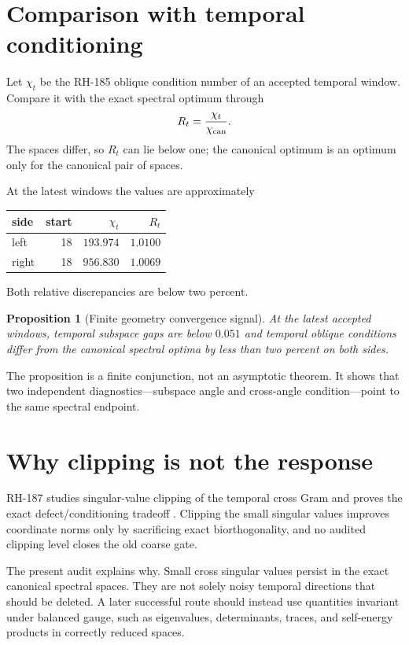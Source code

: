 \documentclass[12pt]{article}
\newtheorem{proposition}{Proposition}[section]
\theoremstyle{remark}
\begin{document}
\section{Comparison with temporal conditioning}

Let $\chi_t$ be the RH-185 oblique condition number of an accepted temporal
window.  Compare it with the exact spectral optimum through
\begin{equation}\label{eq:ratio}
 R_t=\frac{\chi_t}{\chi_{\rm can}}.
\end{equation}
The spaces differ, so $R_t$ can lie below one; the canonical optimum is an
optimum only for the canonical pair of spaces.

At the latest windows the values are approximately
\begin{center}
\begin{tabular}{lrrr}
\toprule
side & start & $\chi_t$ & $R_t$\\
\midrule
left & 18 & $193.974$ & $1.0100$\\
right & 18 & $956.830$ & $1.0069$\\
\bottomrule
\end{tabular}
\end{center}
Both relative discrepancies are below two percent.

\begin{proposition}[Finite geometry convergence signal]\label{prop:geometry-convergence}
At the latest accepted windows, temporal subspace gaps are below $0.051$ and
temporal oblique conditions differ from the canonical spectral optima by
less than two percent on both sides.
\end{proposition}

The proposition is a finite conjunction, not an asymptotic theorem.  It
shows that two independent diagnostics---subspace angle and cross-angle
condition---point to the same spectral endpoint.

\section{Why clipping is not the response}

RH-187 studies singular-value clipping of the temporal cross Gram and proves
the exact defect/conditioning tradeoff \citep{WangRH187}.  Clipping the small
singular values improves coordinate norms only by sacrificing exact
biorthogonality, and no audited clipping level closes the old coarse gate.

The present audit explains why.  Small cross singular values persist in the
exact canonical spectral spaces.  They are not solely noisy temporal
directions that should be deleted.  A later successful route should instead
use quantities invariant under balanced gauge, such as eigenvalues,
determinants, traces, and self-energy products in correctly reduced spaces.
\end{document}
